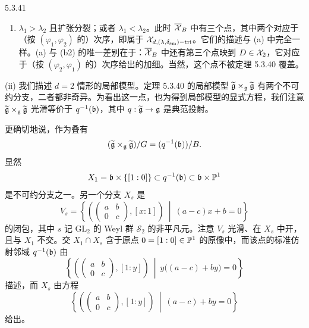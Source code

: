 \begin{exam}{5.3.41}
\begin{enumerate}[label=(\alph*),leftmargin=2.2em,itemsep=0.15em]
\begin{enumerate}[label=({b}\arabic*),leftmargin=2.8em,itemsep=0.15em]
$\ol\XX_B$ 中位于 $D$ 上方恰有两个点，且两者实际上都属于 $\XX_B$。第二个点的出现方式与 (a) 中不同：它来自下述事实——$D$ 也可以写成扩张
\[
0\longrightarrow\mathcal{R}_L(\eta_1)\longrightarrow D\longrightarrow\mathcal{R}_L(\eta_2)\longrightarrow0,
\]
其中 $\eta_1=\mathrm{unr}_{\varphi_2}z^{\lambda_1}$，$\eta_2=\mathrm{unr}_{\varphi_1}z^{\lambda_2}$。也就是说：我们改变了加细（refinement），即改变了 $\varphi_1$ 与 $\varphi_2$ 的次序（而在 (a) 中改变的是权 $\lambda_1,\lambda_2$ 的次序）；换在定理 5.3.40 的语言中，这些点会通过另一个光滑特征标 $\delta_{\mathrm{sm}}$ 的选取来处理。
\item $\lambda_1>\lambda_2$ 且扩张分裂；或者 $\lambda_1<\lambda_2$。此时 $\ol\XX_B$ 中有三个点，其中两个对应于（按 $(\varphi_1,\varphi_2)$ 的）次序，即属于 $\mathcal{X}_{d,(\lambda,\delta_{\mathrm{sm}})-\mathrm{tri}}$。它们的描述与 (a) 中完全一样。(a) 与 (b2) 的唯一差别在于：$\ol\XX_B$ 中还有第三个点映到 $D\in\mathcal{X}_2$，它对应于（按 $(\varphi_2,\varphi_1)$ 的）次序给出的加细。当然，这个点不被定理 5.3.40 覆盖。
\end{enumerate}
\end{enumerate}

(ii) 我们描述 $d=2$ 情形的局部模型。定理 5.3.40 的局部模型 $\widetilde{\mathfrak{g}}\times_{\mathfrak{g}}\widetilde{\mathfrak{g}}$ 有两个不可约分支，二者都非奇异。为看出这一点，也为得到局部模型的显式方程，我们注意 $\widetilde{\mathfrak{g}}\times_{\mathfrak{g}}\widetilde{\mathfrak{g}}$ 光滑等价于 $q^{-1}(\mathfrak{b})$，其中 $q:\widetilde{\mathfrak{g}}\to\mathfrak{g}$ 是典范投射。
\end{exam}

更确切地说，作为叠有
\[
(\widetilde{\mathfrak{g}}\times_{\mathfrak{g}}\widetilde{\mathfrak{g}})/G=(q^{-1}(\mathfrak{b}))/B.
\]
显然
\[
X_1=\mathfrak{b}\times\{[1:0]\}\subset q^{-1}(\mathfrak{b})\subset\mathfrak{b}\times\mathbb{P}^1
\]
是不可约分支之一。另一个分支 $X_s$ 是
\[
V_s=\left\{\left(\begin{pmatrix}a&b\\0&c\end{pmatrix},[x:1]\right)\ \middle|\ (a-c)x+b=0\right\}
\]
的闭包，其中 $s$ 记 $\mathrm{GL}_2$ 的 Weyl 群 $\mathcal{S}_2$ 的非平凡元。注意 $V_s$ 光滑、在 $X_s$ 中开，且与 $X_1$ 不交。交 $X_1\cap X_s$ 含于原点 $0=[1:0]\in\mathbb{P}^1$ 的原像中，而该点的标准仿射邻域 $q^{-1}(\mathfrak{b})$ 由
\[
\left\{\left(\begin{pmatrix}a&b\\0&c\end{pmatrix},[1:y]\right)\ \middle|\ y\bigl((a-c)+by\bigr)=0\right\}
\]
描述，而 $X_s$ 由方程
\[
\left\{\left(\begin{pmatrix}a&b\\0&c\end{pmatrix},[1:y]\right)\ \middle|\ (a-c)+by=0\right\}
\]
给出。

